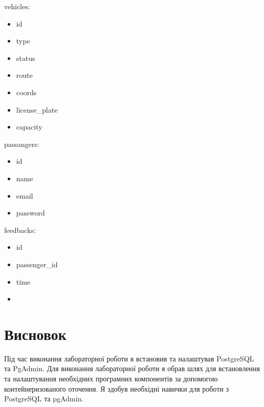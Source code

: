 \documentclass[14pt]{extreport}
\begin{document}
\begin{normalsize}
	vehicles:
	\begin{itemize}
		\item id
		\item type
		\item status
		\item route
		\item coords
		\item license\_plate
		\item capacity
	\end{itemize}

	passangers:
	\begin{itemize}
		\item id
		\item name
		\item email
		\item password
	\end{itemize}

	feedbacks:
	\begin{itemize}
		\item id
		\item passenger\_id
		\item time
		\item 
	\end{itemize}

	\section*{Висновок}
	Під час виконання лабораторної роботи я встановив та налаштував PostgreSQL та PgAdmin. Для виконання лабораторної роботи я обрав шлях для встановлення та налаштування необхідних програмних компонентів за допомогою контейнеризованого оточення. Я здобув необхідні навички для роботи з PostgreSQL та pgAdmin.
	 
\end{normalsize}
\end{document}
